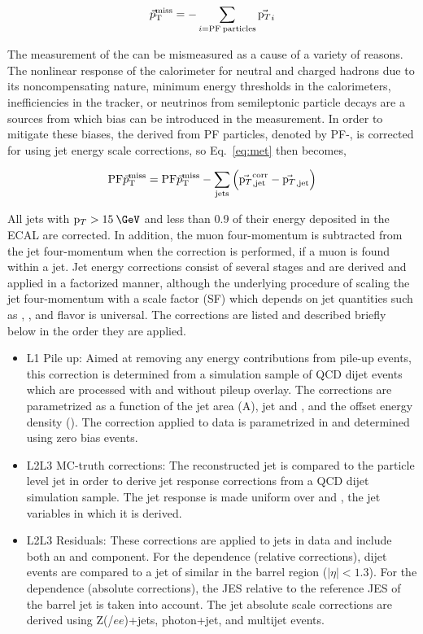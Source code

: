 \begin{equation}
  { \vec{p}_{\text{T}}^{\text{miss}}} = -\sum_{i=\mathrm{PF\:particles}}{\vec{{\mathrm p_{T}}}_{i}}
  \label{eq:met}
\end{equation}

The measurement of the \ptmiss can be mismeasured as a cause of a variety of reasons. The nonlinear response of the calorimeter for neutral and charged hadrons due to its noncompensating nature, minimum energy thresholds in the calorimeters, inefficiencies in the tracker, or neutrinos from semileptonic particle decays are a sources from which bias can be introduced in the \ptmiss measurement. In order to mitigate these biases, the \ptmiss derived from PF particles, denoted by PF-\ptmiss, is corrected for using jet energy scale corrections, so Eq.~\ref{eq:met} then becomes,

\begin{equation}
  \mathrm{PF}{ \vec{p}_{\text{T}}^{\text{miss}}} = \mathrm{PF}{ \vec{p}_{\text{T}}^{\text{miss}}} - \sum_{\mathrm{jets}}{\Big(\vec{{\mathrm p_{T}}}^{\mathrm{corr}}_{\mathrm{,jet}} - \vec{{\mathrm p_{T}}}_{\mathrm{,jet}}\Big)}
\end{equation} 

All jets with $\pt > 15\:\GeV$ and less than 0.9 of their energy deposited in the ECAL are corrected. In addition, the muon four-momentum is subtracted from the jet four-momentum when the correction is performed, if a muon is found within a jet. Jet energy corrections consist of several stages and are derived and applied in a factorized manner, although the underlying procedure of scaling the jet four-momentum with a scale factor (SF) which depends on jet quantities such as \pt, \eta, and flavor is universal. The corrections are listed and described briefly below in the order they are applied.

\begin{itemize}
  \item L1 Pile up: Aimed at removing any energy contributions from pile-up events, this correction is determined from a simulation sample of QCD dijet events which are processed with and without pileup overlay. The corrections are parametrized as a function of the jet area (A), jet \eta and \pt, and the offset energy density (\rho). The correction applied to data is parametrized in \eta and determined using zero bias events.
  \item L2L3 MC-truth corrections: The reconstructed jet \pt is compared to the particle level jet \pt in order to derive jet response corrections from a QCD dijet simulation sample. The jet response is made uniform over \pt and \eta, the jet variables in which it is derived.
  \item L2L3 Residuals: These corrections are applied to jets in data and include both an \eta and \pt component. For the \eta dependence (relative corrections), dijet events are compared to a jet of similar \pt in the barrel region ($|\eta|<1.3$). For the \pt dependence (absolute corrections), the JES relative to the reference JES of the barrel jet is taken into account. The jet absolute scale corrections are derived using Z(\mu\mu/$ee$)+jets, photon+jet, and multijet events.
\end{itemize}

